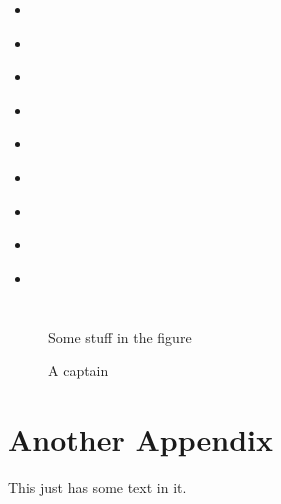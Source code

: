 \documentclass[draft]{dragonfly-report}
\begin{document}
\begin{itemize}
  \item \cite{abraham_summary_98-09}
  \item \citet{baker_nzclassification_2010}
  \item \citep{doc_sealion_2009}
  \item \parencite{gales_phocarctos_2008}
  \item {}
  \item \citeyear{robertson_population_2011}
  \item \textcite{roe_necropsy_2007}
  \item \cite{baker_marinemammals_2010}
  \item \cite{baker_census_2010}
\end{itemize}

\clearpage

\printbibliography


\clearpage
\appendices

\section{}

\begin{figure}
  Some stuff in the figure
  \caption{A captain}
\end{figure}

\section{Another Appendix}

This just has some text in it.
\end{document}
